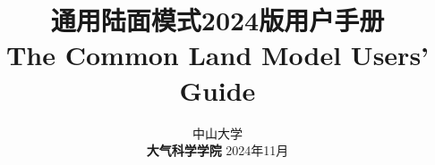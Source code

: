 \documentclass[a4paper,12pt,twoside]{article}
\begin{document}
\title{\huge {\bf 通用陆面模式2024版用户手册}\\
\vspace{6mm}
\fontsize {22}{24}
\bf{ The Common Land Model Users' Guide}
\fontsize {20}{23}
 \vskip 2in
}

\author{
 \large{ 中山大学 }\\[2ex]
 {\bf 大气科学学院}
 \vskip 2in
 \upshape
 \large
 \vskip 0.5in
 2024年11月
}

\normallinespacing
\maketitle

\preface

\clearpage 
\pagestyle{fancy}

\tableofcontents
\clearpage
{}












\end{document}
